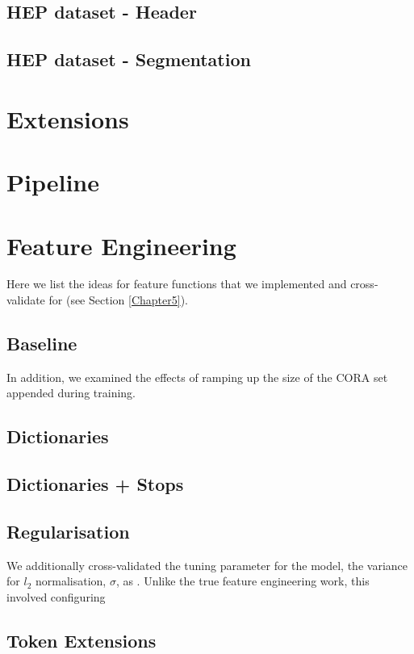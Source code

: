 \subsection{HEP dataset - Header}

\subsection{HEP dataset - Segmentation}

\section{Extensions}

\section{Pipeline}

\section{Feature Engineering}

Here we list the ideas for feature functions that we implemented and cross-validate for (see Section \ref{Chapter5}).

\subsection{Baseline}

In addition, we examined the effects of ramping up the size of the CORA set appended during training.

\subsection{Dictionaries}
\subsection{Dictionaries + Stops}
\subsection{Regularisation}

We additionally cross-validated the tuning parameter for the model, the variance for $l_2$ normalisation, $\sigma$, as . Unlike the true feature engineering work, this involved configuring 

\subsection{Token Extensions}

